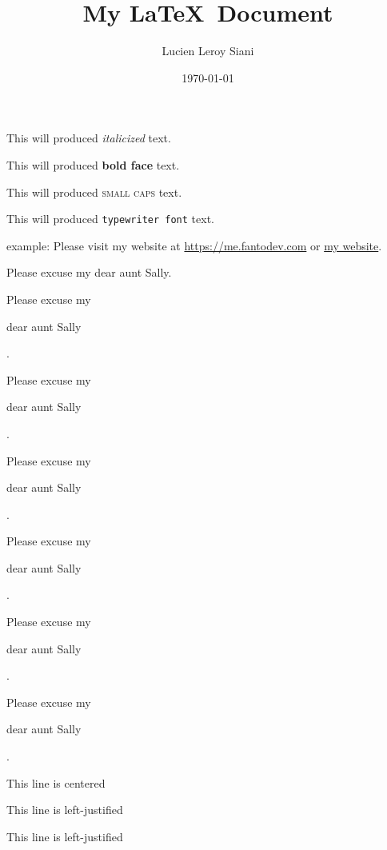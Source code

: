 \documentclass[12pt]{article}
\title{My \LaTeX\ Document}
\author{Lucien Leroy Siani}
\date{\today}
\begin{document}
\maketitle

\pagebreak
\tableofcontents

\pagebreak


This will produced \textit{italicized} text.

This will produced \textbf{bold face} text.

This will produced \textsc{small caps} text.

This will produced \texttt{typewriter font} text.

example: Please visit my website at \url{https://me.fantodev.com} or
\href{https://next.fantodev.com}{my website}.

\vspace*{1cm}
Please excuse my dear aunt Sally.

Please excuse my \begin{Large}dear aunt Sally\end{Large}.

Please excuse my \begin{huge}dear aunt Sally\end{huge}.


Please excuse my \begin{normalsize}dear aunt Sally\end{normalsize}.

Please excuse my \begin{small}dear aunt Sally\end{small}.

Please excuse my \begin{scriptsize}dear aunt Sally\end{scriptsize}.

Please excuse my \begin{tiny}dear aunt Sally\end{tiny}.

\vspace*{1cm}

\begin{center} This line is centered \end{center}
\begin{flushleft} This line is left-justified \end{flushleft}
\begin{flushright} This line is left-justified \end{flushright}
\end{document}
